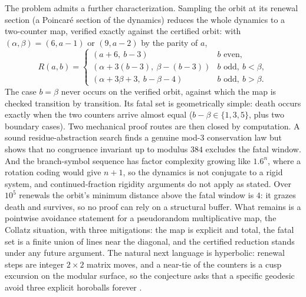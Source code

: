 \documentclass[11pt]{article}
\begin{document}
The problem admits a further characterization. Sampling the orbit at its
renewal section (a Poincar\'e section of the dynamics) reduces the
whole dynamics to a two-counter map,
verified exactly against the certified orbit: with
$(\alpha,\beta) = (6, a{-}1)$ or $(9, a{-}2)$ by the parity of $a$,
$$R(a,b) = \begin{cases}
(a+6,\ b-3) & b \text{ even},\\
(\alpha + 3(b-3),\ \beta - (b-3)) & b \text{ odd},\ b < \beta,\\
(\alpha + 3\beta + 3,\ b - \beta - 4) & b \text{ odd},\ b > \beta.
\end{cases}$$
The case $b = \beta$ never occurs on the verified orbit, against
which the map is checked transition by transition.
Its fatal set is geometrically simple: death occurs exactly when the
two counters arrive almost equal ($b - \beta \in \{1,3,5\}$, plus
two boundary cases). Two mechanical proof routes are then closed by
computation. A sound residue-abstraction search finds a genuine mod-3
conservation law but shows that no congruence invariant up to modulus
$384$ excludes the fatal window. And the branch-symbol sequence has
factor complexity growing like $1.6^{n}$, where a rotation coding
would give $n+1$, so the dynamics is not conjugate to a rigid system, and
continued-fraction rigidity arguments do not apply as stated. Over
$10^{5}$ renewals the orbit's minimum distance above the fatal window
is $4$: it grazes death and survives, so no proof can rely on a
structural buffer. What remains is a pointwise avoidance statement for
a pseudorandom multiplicative map, the Collatz situation, with
three mitigations: the map is explicit and total, the fatal set is a
finite union of lines near the diagonal, and the certified reduction
stands under any future argument. The natural next language is
hyperbolic: renewal steps are integer $2{\times}2$ matrix moves, and a
near-tie of the counters is a cusp excursion on the modular surface, so
the conjecture asks that a specific geodesic avoid three explicit
horoballs forever \cite{series}.
\end{document}
